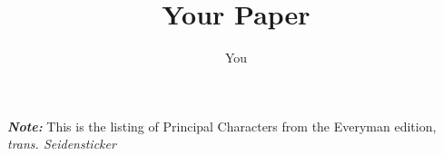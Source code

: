 \documentclass{article}
\title{Your Paper}
\author{You}
\begin{document}



\begin{figure}
\end{figure}


\clearpage




\noindent \textbf{\textit{Note:}} This is the listing of Principal Characters from the Everyman edition, \textit{trans. Seidensticker}
\vspace{-0.5em}
\end{document}
